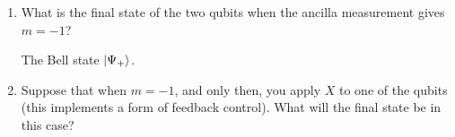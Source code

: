 \documentclass[12pt]{article}
\newenvironment{answer}{\begingroup\setlength{\leftskip}{-\leftmargin}\begin{framed}}{\end{framed}\endgroup}
\begin{document}
\begin{enumerate}
    \item What is the final state of the two qubits when the ancilla measurement gives $m = -1$?

    \begin{answer}
        The Bell state $\ket{\Psi_+}$.
    \end{answer}

    \item Suppose that when $m = -1$, and only then, you apply $X$ to one of the qubits (this implements a form of feedback control). What will the final state be in this case?

    \begin{answer}

    \end{answer}
\end{enumerate}
\end{document}
